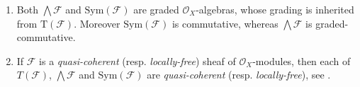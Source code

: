 \begin{rem}[]\leavevmode\vspace{-.2\baselineskip}
\label{rem:SheafSymExtProperties}
\begin{enumerate}
	\item Both $\bigwedge \mathcal{F}$ and $\mathrm{Sym}(\mathcal{F})$
		are graded $\mathcal{O}_{ X }$-algebras, whose grading is
		inherited from $\mathrm{T}(\mathcal{F})$.
		Moreover $\mathrm{Sym}(\mathcal{F})$ is commutative,
		whereas $\bigwedge \mathcal{F}$ is graded-commutative.


	\item \label{SheafqcSymExt}
		If $\mathcal{F}$ is a {\em quasi-coherent} (resp$.$ {\em locally-free})
		sheaf of $\mathcal{O}_{ X }$-modules,
		then each of $T(\mathcal{F})$, $\bigwedge \mathcal{F}$ and
		$\mathrm{Sym}(\mathcal{F})$ are {\em quasi-coherent} (resp$.$ {\em locally-free}),
		see \cite[\href{https://stacks.math.columbia.edu/tag/01CL}{Lemma 01CL}]{SP}.
\end{enumerate}
\end{rem}


